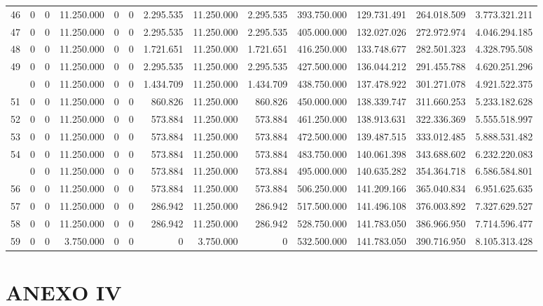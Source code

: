 \documentclass[
  10pt,
  a4paper]{article}
\begin{document}
\begin{landscape}
\begin{longtable}[t]{rrrrrrrrrrrrr}
46 & 0 & 0 & 11.250.000 & 0 & 0 & 2.295.535 & 11.250.000 & 2.295.535 & 393.750.000 & 129.731.491 & 264.018.509 & 3.773.321.211\\
47 & 0 & 0 & 11.250.000 & 0 & 0 & 2.295.535 & 11.250.000 & 2.295.535 & 405.000.000 & 132.027.026 & 272.972.974 & 4.046.294.185\\
48 & 0 & 0 & 11.250.000 & 0 & 0 & 1.721.651 & 11.250.000 & 1.721.651 & 416.250.000 & 133.748.677 & 282.501.323 & 4.328.795.508\\
49 & 0 & 0 & 11.250.000 & 0 & 0 & 2.295.535 & 11.250.000 & 2.295.535 & 427.500.000 & 136.044.212 & 291.455.788 & 4.620.251.296\\
\addlinespace
50 & 0 & 0 & 11.250.000 & 0 & 0 & 1.434.709 & 11.250.000 & 1.434.709 & 438.750.000 & 137.478.922 & 301.271.078 & 4.921.522.375\\
51 & 0 & 0 & 11.250.000 & 0 & 0 & 860.826 & 11.250.000 & 860.826 & 450.000.000 & 138.339.747 & 311.660.253 & 5.233.182.628\\
52 & 0 & 0 & 11.250.000 & 0 & 0 & 573.884 & 11.250.000 & 573.884 & 461.250.000 & 138.913.631 & 322.336.369 & 5.555.518.997\\
53 & 0 & 0 & 11.250.000 & 0 & 0 & 573.884 & 11.250.000 & 573.884 & 472.500.000 & 139.487.515 & 333.012.485 & 5.888.531.482\\
54 & 0 & 0 & 11.250.000 & 0 & 0 & 573.884 & 11.250.000 & 573.884 & 483.750.000 & 140.061.398 & 343.688.602 & 6.232.220.083\\
\addlinespace
55 & 0 & 0 & 11.250.000 & 0 & 0 & 573.884 & 11.250.000 & 573.884 & 495.000.000 & 140.635.282 & 354.364.718 & 6.586.584.801\\
56 & 0 & 0 & 11.250.000 & 0 & 0 & 573.884 & 11.250.000 & 573.884 & 506.250.000 & 141.209.166 & 365.040.834 & 6.951.625.635\\
57 & 0 & 0 & 11.250.000 & 0 & 0 & 286.942 & 11.250.000 & 286.942 & 517.500.000 & 141.496.108 & 376.003.892 & 7.327.629.527\\
58 & 0 & 0 & 11.250.000 & 0 & 0 & 286.942 & 11.250.000 & 286.942 & 528.750.000 & 141.783.050 & 386.966.950 & 7.714.596.477\\
59 & 0 & 0 & 3.750.000 & 0 & 0 & 0 & 3.750.000 & 0 & 532.500.000 & 141.783.050 & 390.716.950 & 8.105.313.428\\*
\end{longtable}
\endgroup{}
\end{landscape}

\restoregeometry

\section*{ANEXO IV}\label{anexo-iv}
\end{document}
